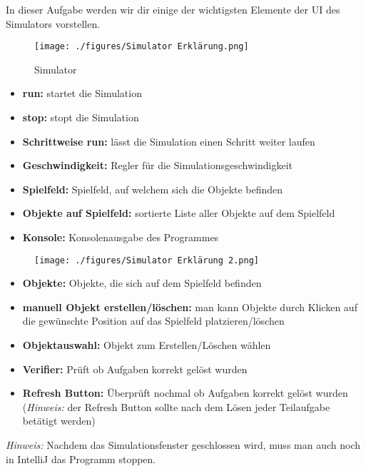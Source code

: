 
\label{ex4}

In dieser Aufgabe werden wir dir einige der wichtigsten Elemente der UI des Simulators vorstellen.
\begin{figure}[h]
    \begin{center}
        \texttt{[image: ./figures/Simulator Erklärung.png]}
    \end{center}
    \caption{Simulator}
    \label{fig:Simulation}
\end{figure}
\begin{itemize}
    \item \textbf{run:} startet die Simulation
    \item \textbf{stop:} stopt die Simulation
    \item \textbf{Schrittweise run:} lässt die Simulation einen Schritt weiter laufen
    \item \textbf{Geschwindigkeit:} Regler für die Simulationsgeschwindigkeit
    \item \textbf{Spielfeld:} Spielfeld, auf welchem sich die Objekte befinden
    \item \textbf{Objekte auf Spielfeld:} sortierte Liste aller Objekte auf dem Spielfeld
    \item \textbf{Konsole:} Konsolenausgabe des Programmes
\end{itemize}
\newpage
\begin{figure}
    
\begin{center}
    \texttt{[image: ./figures/Simulator Erklärung 2.png]}
\end{center}
\caption{}
\label{fig:Simulation2}
\end{figure}


\begin{itemize}
    \item \textbf{Objekte:} Objekte, die sich auf dem Spielfeld befinden
    \item \textbf{manuell Objekt erstellen/löschen:} man kann Objekte durch Klicken auf die gewünschte Position auf das Spielfeld platzieren/löschen
    \item \textbf{Objektauswahl:} Objekt zum Erstellen/Löschen wählen
    \item \textbf{Verifier:} Prüft ob Aufgaben korrekt gelöst wurden
    \item \textbf{Refresh Button:} Überprüft nochmal ob Aufgaben korrekt gelöst wurden (\textit{Hinweis:} der Refresh Button sollte nach dem Lösen jeder Teilaufgabe betätigt werden)
\end{itemize}
\textit{Hinweis:} Nachdem das Simulationsfenster geschlossen wird, muss man  auch noch in IntelliJ das Programm stoppen.
